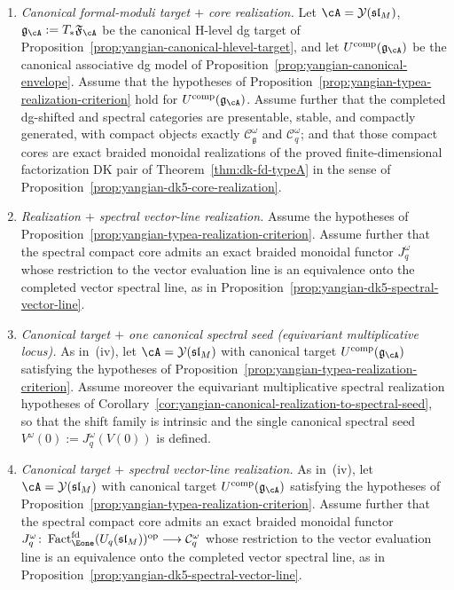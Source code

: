 \begin{theorem}
\begin{enumerate}[label=\textup{(\roman*)}]
\item\emph{Canonical formal-moduli target $+$ core realization.}
  Let $\cA=\mathcal{Y}(\mathfrak{sl}_M)$,
  $\mathfrak{g}_{\cA}:=T_*\mathfrak{F}_{\cA}$ be the canonical
  H-level dg target of
  Proposition~\ref{prop:yangian-canonical-hlevel-target}, and let
  $U^{\mathrm{comp}}(\mathfrak{g}_{\cA})$ be the canonical associative
  dg model of Proposition~\ref{prop:yangian-canonical-envelope}.
  Assume that the hypotheses of
  Proposition~\ref{prop:yangian-typea-realization-criterion} hold for
  $U^{\mathrm{comp}}(\mathfrak{g}_{\cA})$.  Assume further that the
  completed dg-shifted and spectral categories are presentable, stable,
  and compactly generated, with compact objects exactly
  $\mathcal{C}_{\mathfrak g}^\omega$ and $\mathcal{C}_q^\omega$; and
  that those compact cores are exact braided monoidal realizations of
  the proved finite-dimensional factorization DK pair of
  Theorem~\ref{thm:dk-fd-typeA} in the sense of
  Proposition~\ref{prop:yangian-dk5-core-realization}.

\item\emph{Realization $+$ spectral vector-line realization.}
  Assume the hypotheses of
  Proposition~\ref{prop:yangian-typea-realization-criterion}.  Assume
  further that the spectral compact core admits an exact braided
  monoidal functor $J_q^\omega$ whose restriction to the vector
  evaluation line is an equivalence onto the completed vector spectral
  line, as in
  Proposition~\ref{prop:yangian-dk5-spectral-vector-line}.

\item\emph{Canonical target $+$ one canonical spectral seed
  (equivariant multiplicative locus).}
  As in~\textup{(iv)}, let $\cA=\mathcal{Y}(\mathfrak{sl}_M)$ with
  canonical target
  $U^{\mathrm{comp}}(\mathfrak{g}_{\cA})$ satisfying the hypotheses of
  Proposition~\ref{prop:yangian-typea-realization-criterion}.  Assume
  moreover the equivariant multiplicative spectral realization
  hypotheses of
  Corollary~\ref{cor:yangian-canonical-realization-to-spectral-seed},
  so that the shift family is intrinsic and the single canonical
  spectral seed $V^\omega(0):=J_q^\omega(V(0))$ is defined.

\item\emph{Canonical target $+$ spectral vector-line realization.}
  As in~\textup{(iv)}, let $\cA=\mathcal{Y}(\mathfrak{sl}_M)$ with
  canonical target
  $U^{\mathrm{comp}}(\mathfrak{g}_{\cA})$ satisfying the hypotheses of
  Proposition~\ref{prop:yangian-typea-realization-criterion}.  Assume
  further that the spectral compact core admits an exact braided
  monoidal functor
  \(J_q^\omega\colon
  \operatorname{Fact}_{\Eone}^{\mathrm{fd}}(U_q(\mathfrak{sl}_M))^{\mathrm{op}}
  \longrightarrow \mathcal C_q^\omega\)
  whose restriction to the vector evaluation line is an equivalence
  onto the completed vector spectral line, as in
  Proposition~\ref{prop:yangian-dk5-spectral-vector-line}.
\end{enumerate}
\end{theorem}

